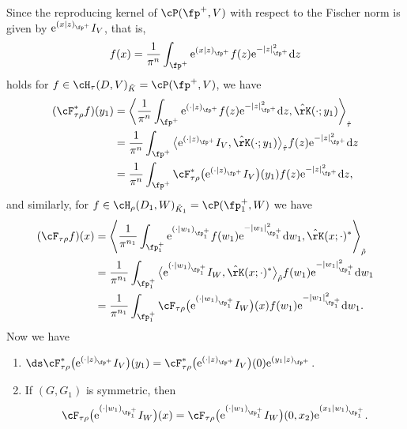 Since the reproducing kernel of $\cP(\fp^+,V)$ with respect to the Fischer norm
is given by ${\rm e}^{(x|z)_{\fp^+}}I_V$, that is,
\begin{gather*} f(x)=\frac{1}{\pi^n}\int_{\fp^+}{\rm e}^{(x|z)_{\fp^+}}f(z){\rm e}^{-|z|_{\fp^+}^2}{\rm d}z \end{gather*}
holds for $f\in \cH_\tau(D,V)_{\tilde{K}}=\cP(\fp^+,V)$, we have
\begin{align*}
(\cF_{\tau\rho}^*f)(y_1)&=\left\langle \frac{1}{\pi^n}\int_{\fp^+}{\rm e}^{(\cdot|z)_{\fp^+}}f(z){\rm e}^{-|z|_{\fp^+}^2}{\rm d}z,
\hat{\rK}(\cdot;y_1)\right\rangle_{\hat{\tau}} \\
&=\frac{1}{\pi^n}\int_{\fp^+}\big\langle {\rm e}^{(\cdot|z)_{\fp^+}}I_V,\hat{\rK}(\cdot;y_1)\big\rangle_{\hat{\tau}}f(z){\rm e}^{-|z|_{\fp^+}^2}{\rm d}z \\
&=\frac{1}{\pi^n}\int_{\fp^+}\cF_{\tau\rho}^*\big({\rm e}^{(\cdot|z)_{\fp^+}}I_V\big)(y_1)f(z){\rm e}^{-|z|_{\fp^+}^2}{\rm d}z,
\end{align*}
and similarly, for $f\in \cH_\rho(D_1,W)_{\tilde{K}_1}=\cP(\fp^+_1,W)$ we have
\begin{align*}
(\cF_{\tau\rho}f)(x)&=\left\langle \frac{1}{\pi^{n_1}}\int_{\fp^+_1}{\rm e}^{(\cdot|w_1)_{\fp^+_1}}f(w_1){\rm e}^{-|w_1|_{\fp^+_1}^2}{\rm d}w_1,
\hat{\rK}(x;\cdot)^*\right\rangle_{\hat{\rho}} \\
&=\frac{1}{\pi^{n_1}}\int_{\fp^+_1}\big\langle {\rm e}^{(\cdot|w_1)_{\fp^+_1}}I_W,\hat{\rK}(x;\cdot)^*\big\rangle_{\hat{\rho}}
f(w_1){\rm e}^{-|w_1|_{\fp^+_1}^2}{\rm d}w_1 \\
&=\frac{1}{\pi^{n_1}}\int_{\fp^+_1}\cF_{\tau\rho}\big({\rm e}^{(\cdot|w_1)_{\fp^+_1}}I_W\big)(x)f(w_1){\rm e}^{-|w_1|_{\fp^+_1}^2}{\rm d}w_1.
\end{align*}
Now we have
\begin{Lemma}\quad
\begin{enumerate}\itemsep=0pt
\item[$(1)$] $\ds \cF_{\tau\rho}^*\big({\rm e}^{(\cdot|z)_{\fp^+}}I_V\big)(y_1)=\cF_{\tau\rho}^*\big({\rm e}^{(\cdot|z)_{\fp^+}}I_V\big)(0){\rm e}^{(y_1|z)_{\fp^+}}$.
\item[$(2)$] If $(G,G_1)$ is symmetric, then
\begin{gather*} \cF_{\tau\rho}\big({\rm e}^{(\cdot|w_1)_{\fp^+_1}}I_W\big)(x)=\cF_{\tau\rho}\big({\rm e}^{(\cdot|w_1)_{\fp^+_1}}I_W\big)(0,x_2){\rm e}^{(x_1|w_1)_{\fp^+_1}}. \end{gather*}
\end{enumerate}
\end{Lemma}
